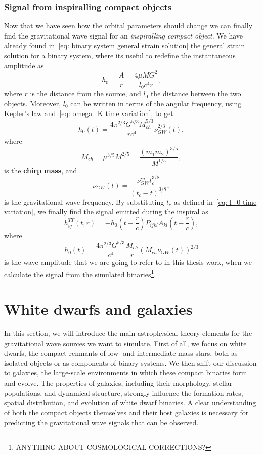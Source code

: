 \subsubsection{Signal from inspiralling compact objects}
Now that we have seen how the orbital parameters should change we can finally find the gravitational wave signal for an \textit{inspiralling compact object}.
We have already found in~\eqref{eq: binary system general strain solution} the general strain solution for a binary system, where its useful to redefine the instantaneous amplitude as
\[
    h_0 = \frac{A}{r} = \frac{4\mu M G^2}{l_0c^4r},
\]
where $r$ is the distance from the source, and $l_0$ the distance between the two objects.
Moreover, $l_0$ can be written in terms of the angular frequency, using Kepler's law and~\eqref{eq: omega_K time variation}, to get
\[
    h_0(t)=\frac{4\pi^{2/3}G^{5/3}M_{ch}^{5/3}}{rc^4}\nu_{GW}^{2/3}(t),
\]
where
\begin{equation}
    M_{ch} = \mu^{3/5}M^{2/5} = \frac{(m_1m_2)^{3/5}}{M^{1/5}},
    \label{eq: chirp mass definition}
\end{equation}
is the \textbf{chirp mass}, and 
\begin{equation}
    \nu_{GW}(t)=\frac{\nu_{GW}^{in}t_c^{3/8}}{(t_c-t)^{3/8}},
    \label{eq: nu time variation}
\end{equation}
is the gravitational wave frequency.
By substituting $t_c$ as defined in~\eqref{eq: l_0 time variation}, we finally find the signal emitted during the inspiral as
\begin{equation}
    h_{ij}^{TT}(t,r)= -h_0\left(t-\frac{r}{c}\right)P_{ijkl}A_{kl}\left(t-\frac{r}{c}\right),
    \label{eq: full inspiral signal}
\end{equation}
where
\begin{equation}
    \boxed{h_0(t)= \frac{4\pi^{2/3}G^{5/3}}{c^4}\frac{M_{ch}}{r}(M_{ch}\nu_{GW}(t))^{2/3}}
    \label{eq: the strain we use}
\end{equation}
is the wave amplitude that we are going to refer to in this thesis work, when we calculate the signal from the simulated binaries\footnote{ANYTHING ABOUT COSMOLOGICAL CORRECTIONS?}.

\section{White dwarfs and galaxies}
In this section, we will introduce the main astrophysical theory elements for the gravitational wave sources we want to simulate.
First of all, we focus on white dwarfs, the compact remnants of low- and intermediate-mass stars, both as isolated objects or as components of binary systems.  
We then shift our discussion to galaxies, the large-scale environments in which these compact binaries form and evolve. 
The properties of galaxies, including their morphology, stellar populations, and dynamical structure, strongly influence the formation rates, spatial distribution, and evolution of white dwarf binaries. 
A clear understanding of both the compact objects themselves and their host galaxies is necessary for predicting the gravitational wave signals that can be observed.

